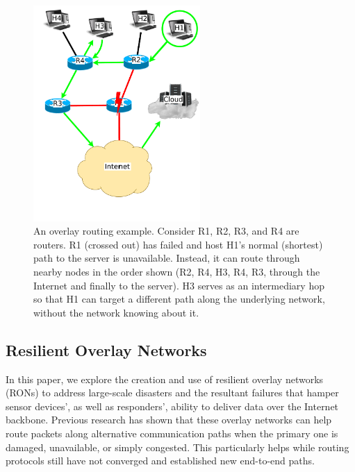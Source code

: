 \documentclass[conference]{IEEEtran}
\begin{document}
\begin{figure}[!t]
\centering
\includegraphics[width=2.5in]{overlay_path.pdf}
\caption{An overlay routing example.  Consider R1, R2, R3, and R4 are routers.  R1 (crossed out) has failed and host H1's normal (shortest) path to the server is unavailable.  Instead, it can route through nearby nodes in the order shown (R2, R4, H3, R4, R3, through the Internet and finally to the server).  H3 serves as an intermediary hop so that H1 can target a different path along the underlying network, without the network knowing about it.}
\label{fig_overlay_path}
\end{figure}

\subsection{Resilient Overlay Networks}

In this paper, we explore the creation and use of resilient overlay networks (RONs) to address large-scale disasters and the resultant failures that hamper sensor devices', as well as responders', ability to deliver data over the Internet backbone.
Previous research \cite{ron,reactive_routing} has shown that these overlay networks can help route packets along alternative communication paths when the primary one is damaged, unavailable, or simply congested.
This particularly helps while routing protocols still have not converged and established new end-to-end paths.

\end{document}
